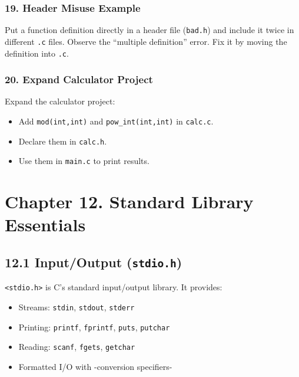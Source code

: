 \documentclass[
  letterpaper,
  DIV=11,
  numbers=noendperiod]{scrreprt}
\providecommand{\tightlist}{%
  \setlength{\itemsep}{0pt}\setlength{\parskip}{0pt}}
\begin{document}
\subsubsection{19. Header Misuse Example}\label{header-misuse-example}

Put a function definition directly in a header file (\texttt{bad.h}) and
include it twice in different \texttt{.c} files. Observe the ``multiple
definition'' error. Fix it by moving the definition into \texttt{.c}.

\subsubsection{20. Expand Calculator
Project}\label{expand-calculator-project}

Expand the calculator project:

\begin{itemize}
\tightlist
\item
  Add \texttt{mod(int,int)} and \texttt{pow\_int(int,int)} in
  \texttt{calc.c}.
\item
  Declare them in \texttt{calc.h}.
\item
  Use them in \texttt{main.c} to print results.
\end{itemize}

\section{Chapter 12. Standard Library
Essentials}\label{chapter-12.-standard-library-essentials}

\subsection{\texorpdfstring{12.1 Input/Output
(\texttt{stdio.h})}{12.1 Input/Output (stdio.h)}}\label{inputoutput-stdio.h}

\texttt{\textless{}stdio.h\textgreater{}} is C's standard input/output
library. It provides:

\begin{itemize}
\tightlist
\item
  Streams: \texttt{stdin}, \texttt{stdout}, \texttt{stderr}
\item
  Printing: \texttt{printf}, \texttt{fprintf}, \texttt{puts},
  \texttt{putchar}
\item
  Reading: \texttt{scanf}, \texttt{fgets}, \texttt{getchar}
\item
  Formatted I/O with -conversion specifiers-
\end{itemize}
\end{document}
